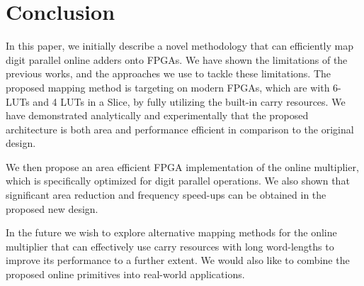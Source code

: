 \documentclass[conference]{IEEEtran}
\begin{document}
\section{Conclusion}
In this paper, we initially describe a novel methodology that can efficiently map digit parallel online adders onto FPGAs. We have shown the limitations of the previous works, and the approaches we use to tackle these limitations. The proposed mapping method is targeting on modern FPGAs, which are with 6-LUTs and 4 LUTs in a Slice, by fully utilizing the built-in carry resources. We have demonstrated analytically and experimentally that the proposed architecture is both area and performance efficient in comparison to the original design. 

We then propose an area efficient FPGA implementation of the online multiplier, which is specifically optimized for digit parallel operations. We also shown that significant area reduction and frequency speed-ups can be obtained in the proposed new design.

In the future we wish to explore alternative mapping methods for the online multiplier that can effectively use carry resources with long word-lengths to improve  its performance to a further extent. We would also like to combine the proposed online primitives into real-world applications.











%


\end{document}
